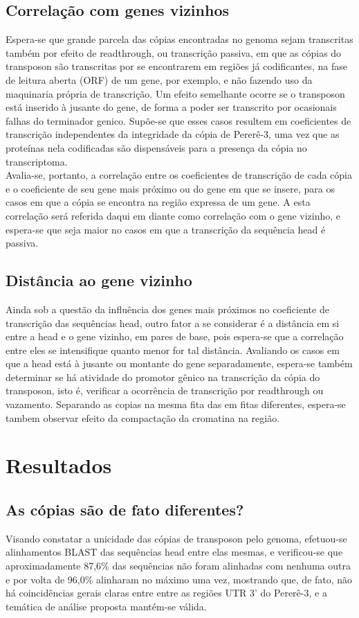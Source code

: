 \documentclass{article}
\begin{document}
\begin{multicols}{2}
\subsection{Correlação com genes vizinhos}
Espera-se que grande parcela das cópias encontradas no genoma sejam transcritas também por efeito de readthrough, ou transcrição passiva, em que as cópias do transposon são transcritas por se encontrarem em regiões já codificantes, na fase de leitura aberta (ORF) de um gene, por exemplo, e não fazendo uso da maquinaria própria de transcrição. Um efeito semelhante ocorre se o transposon está inserido à jusante do gene, de forma a poder ser transcrito por ocasionais falhas do terminador genico. Supõe-se que esses casos resultem em coeficientes de transcrição independentes da integridade da cópia de Pererê-3, uma vez que as proteínas nela codificadas são dispensáveis para a presença da cópia no transcriptoma.\\

Avalia-se, portanto, a correlação entre os coeficientes de transcrição de cada cópia e o coeficiente de seu gene mais próximo ou do gene em que se insere, para os casos em que a cópia se encontra na região expressa de um gene. A esta correlação será referida daqui em diante como correlação com o gene vizinho, e espera-se que seja maior no casos em que a transcrição da sequência head é passiva.

\subsection{Distância ao gene vizinho}
Ainda sob a questão da influência dos genes mais próximos no coeficiente de transcrição das sequências head, outro fator a se considerar é a distância em si entre a head e o gene vizinho, em pares de base, pois espera-se que a correlação entre eles se intensifique quanto menor for tal distância. Avaliando os casos em que a head está à jusante ou montante do gene separadamente, espera-se também determinar se há atividade do promotor gênico na transcrição da cópia do transposon, isto é, verificar a ocorrência de transcrição por readthrough ou vazamento. Separando as copias na mesma fita das em fitas diferentes, espera-se tambem observar efeito da compactação da cromatina na região.

\section{Resultados}

\subsection{As cópias são de fato diferentes?}
Visando constatar a unicidade das cópias de transposon pelo genoma, efetuou-se alinhamentos BLAST das sequências head entre elas mesmas, e verificou-se que aproximadamente 87,6\% das sequências não foram alinhadas com nenhuma outra e por volta de 96,0\% alinharam no máximo uma vez, mostrando que, de fato, não há coincidências gerais claras entre entre as regiões UTR 3' do Pererê-3, e a temática de análise proposta mantém-se válida.

\end{multicols}
\end{document}
